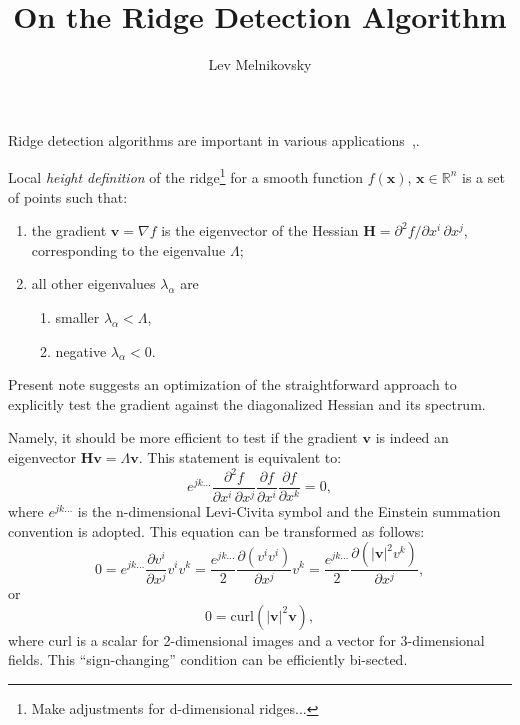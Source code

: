 \documentclass{article}
\author{Lev Melnikovsky}
\title{On the Ridge Detection Algorithm}
\newcommand{\pd}[2]{\ensuremath{\frac{\partial #1}{\partial #2}}}
\begin{document}
\maketitle

Ridge detection algorithms are important in various applications~\cite{ridges94},\cite{ridges96}.

Local \textit{height definition} of the ridge\footnote{Make adjustments for d-dimensional ridges...} for a smooth function $f(\mathbf{x})$, $\mathbf{x} \in \mathbb{R}^n$ is a set of points such that:
\begin{enumerate}
\item the gradient $\mathbf{v} = \nabla f$ is the eigenvector of the Hessian $\boldsymbol{H} = \partial^2 \! f/\partial x^i\, \partial x^j$, corresponding to the eigenvalue $\Lambda$;
\item all other eigenvalues $\lambda_\alpha$ are 
\begin{enumerate}
\item smaller $\lambda_\alpha < \Lambda$,
\item negative $\lambda_\alpha <0$.
\end{enumerate} 
\end{enumerate}

Present note suggests an optimization of the straightforward approach to explicitly test the gradient against the diagonalized Hessian and its spectrum.

Namely, it should be more efficient to test if the gradient $\mathbf{v}$ is indeed an eigenvector $\boldsymbol{H} \mathbf{v} = \Lambda\mathbf{v}$. This statement is equivalent to:
\begin{equation}
e^{j k \dots}
\frac{\partial^2 \! f}{\partial x^i\, \partial x^j}
\pd{f}{x^i}\pd{f}{x^k}
=0,
\end{equation}
where $e^{j k \dots}$ is the n-dimensional Levi-Civita symbol and the Einstein summation convention is adopted. This equation can be transformed as follows:
\begin{equation}
0=
e^{j k \dots}
\pd{v^i}{x^j} v^i v^k=
\frac{e^{j k \dots}}{2}
\pd{(v^i v^i)}{x^j}  v^k=
\frac{e^{j k \dots}}{2}
\pd{(\left|\mathbf{v}\right|^2 v^k)}{x^j},
\end{equation}
or
\begin{equation}
\label{curl}
0=
\mathrm{curl} \left(\left|\mathbf{v}\right|^2 \mathbf{v}\right),
\end{equation}
where $\mathrm{curl}$ is a scalar for 2-dimensional images and a vector for 3-dimensional fields. This ``sign-changing'' condition can be efficiently bi-sected.
\end{document}
